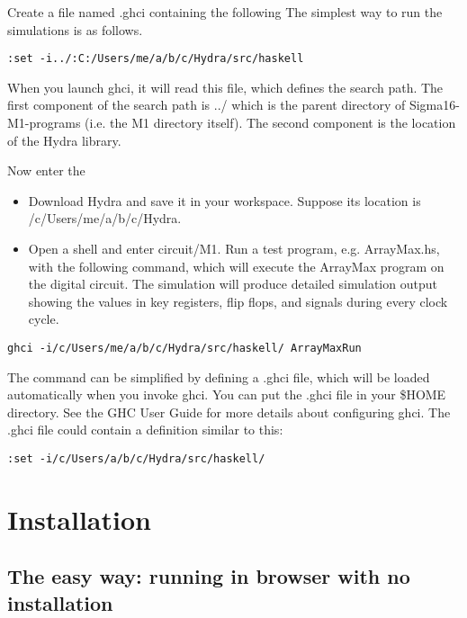 \documentclass[11pt]{article}
\begin{document}
Create a file named .ghci containing the following
The simplest way to run the simulations is as follows.

\begin{verbatim}
:set -i../:C:/Users/me/a/b/c/Hydra/src/haskell
\end{verbatim}

When you launch ghci, it will read this file, which defines the search
path.  The first component of the search path is ../ which is the
parent directory of Sigma16-M1-programs (i.e. the M1 directory
itself).  The second component is the location of the Hydra library.

Now enter the

\begin{itemize}
\item Download Hydra and save it in your workspace.  Suppose its location
is /c/Users/me/a/b/c/Hydra.

\item Open a shell and enter circuit/M1.  Run a test program,
e.g. ArrayMax.hs, with the following command, which will execute the
ArrayMax program on the digital circuit.  The simulation will
produce detailed simulation output showing the values in key
registers, flip flops, and signals during every clock cycle.
\end{itemize}

\begin{verbatim}
ghci -i/c/Users/me/a/b/c/Hydra/src/haskell/ ArrayMaxRun
\end{verbatim}

The command can be simplified by defining a .ghci file, which will be
loaded automatically when you invoke ghci.  You can put the .ghci file
in your \$HOME directory.  See the GHC User Guide for more details
about configuring ghci.  The .ghci file could contain a definition
similar to this:

\begin{verbatim}
:set -i/c/Users/a/b/c/Hydra/src/haskell/
\end{verbatim}

\section*{Installation}
\label{sec:org910d4e3}

\subsection*{The easy way: running in browser with no installation}
\label{sec:org0cea2b7}
\end{document}

